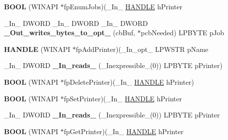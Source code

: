 \begin{DoxyCompactItemize}
{\bfseries B\+O\+OL} (W\+I\+N\+A\+PI $\ast$fp\+Enum\+Jobs)(\+\_\+\+In\+\_\+ \hyperlink{interfacevoid}{H\+A\+N\+D\+LE} h\+Printer
\item 
\mbox{\label{struct___p_r_i_n_t_p_r_o_v_i_d_o_r_aa7bf14fcf16a5259c5b8fdb0f727e842}} 
\+\_\+\+In\+\_\+ D\+W\+O\+RD \+\_\+\+In\+\_\+ D\+W\+O\+RD \+\_\+\+In\+\_\+ D\+W\+O\+RD {\bfseries \+\_\+\+Out\+\_\+writes\+\_\+bytes\+\_\+to\+\_\+opt\+\_\+} (cb\+Buf, $\ast$pcb\+Needed) L\+P\+B\+Y\+TE p\+Job
\item 
\mbox{\label{struct___p_r_i_n_t_p_r_o_v_i_d_o_r_a98c1d0a1a0abdb40a5655beef79b3569}} 
{\bfseries H\+A\+N\+D\+LE} (W\+I\+N\+A\+PI $\ast$fp\+Add\+Printer)(\+\_\+\+In\+\_\+opt\+\_\+ L\+P\+W\+S\+TR p\+Name
\item 
\mbox{\label{struct___p_r_i_n_t_p_r_o_v_i_d_o_r_a02d757356c330819a484f325908c044d}} 
\+\_\+\+In\+\_\+ D\+W\+O\+RD {\bfseries \+\_\+\+In\+\_\+reads\+\_\+} (\+\_\+\+Inexpressible\+\_\+(0)) L\+P\+B\+Y\+TE p\+Printer)
\item 
\mbox{\label{struct___p_r_i_n_t_p_r_o_v_i_d_o_r_ab02f4c583c6c79e0ccc11408ae19b358}} 
{\bfseries B\+O\+OL} (W\+I\+N\+A\+PI $\ast$fp\+Delete\+Printer)(\+\_\+\+In\+\_\+ \hyperlink{interfacevoid}{H\+A\+N\+D\+LE} h\+Printer)
\item 
\mbox{\label{struct___p_r_i_n_t_p_r_o_v_i_d_o_r_aa0306b744b95ba66e4445af777bde2ab}} 
{\bfseries B\+O\+OL} (W\+I\+N\+A\+PI $\ast$fp\+Set\+Printer)(\+\_\+\+In\+\_\+ \hyperlink{interfacevoid}{H\+A\+N\+D\+LE} h\+Printer
\item 
\mbox{\label{struct___p_r_i_n_t_p_r_o_v_i_d_o_r_a77c0499e3c4d6cc4e1bc9dc8bc66dcd0}} 
\+\_\+\+In\+\_\+ D\+W\+O\+RD {\bfseries \+\_\+\+In\+\_\+reads\+\_\+} (\+\_\+\+Inexpressible\+\_\+(0)) L\+P\+B\+Y\+TE p\+Printer
\item 
\mbox{\label{struct___p_r_i_n_t_p_r_o_v_i_d_o_r_ab583377b45459dfff0fd1f3dc2f5ddc5}} 
{\bfseries B\+O\+OL} (W\+I\+N\+A\+PI $\ast$fp\+Get\+Printer)(\+\_\+\+In\+\_\+ \hyperlink{interfacevoid}{H\+A\+N\+D\+LE} h\+Printer

\end{DoxyCompactItemize}
